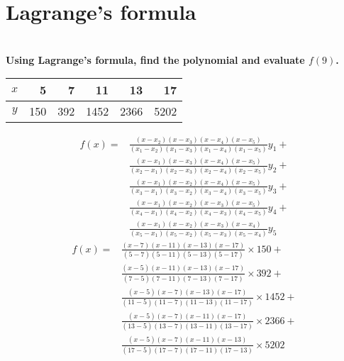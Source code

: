 \documentclass[]{book}
\begin{document}
\chapter{Lagrange's formula}

\\ \textbf{Using Lagrange's formula, find the polynomial and evaluate $f(9)$.}
\begin{center}
\begin{tabular}{|c|r|r|r|r|r|}
\hline
$x$ & 5 & 7 & 11 & 13 & 17\\
\hline
$y$ & 150 & 392 & 1452 & 2366 & 5202\\
\hline
\end{tabular}
\end{center}
\begin{equation*}
\begin{aligned}
f(x) ={} &\frac{\left(x-x_{2}\right)\left(x-x_{3}\right)\left(x-x_{4}\right)\left(x-x_{5}\right)}{\left(x_{1}-x_{2}\right)\left(x_{1}-x_{3}\right)\left(x_{1}-x_{4}\right)\left(x_{1}-x_{5}\right)}y_{1}+\\
&\frac{\left(x-x_{1}\right)\left(x-x_{3}\right)\left(x-x_{4}\right)\left(x-x_{5}\right)}{\left(x_{2}-x_{1}\right)\left(x_{2}-x_{3}\right)\left(x_{2}-x_{4}\right)\left(x_{2}-x_{5}\right)}y_{2}+\\
&\frac{\left(x-x_{1}\right)\left(x-x_{2}\right)\left(x-x_{4}\right)\left(x-x_{5}\right)}{\left(x_{3}-x_{1}\right)\left(x_{3}-x_{2}\right)\left(x_{3}-x_{4}\right)\left(x_{3}-x_{5}\right)}y_{3}+\\
&\frac{\left(x-x_{1}\right)\left(x-x_{2}\right)\left(x-x_{3}\right)\left(x-x_{5}\right)}{\left(x_{4}-x_{1}\right)\left(x_{4}-x_{2}\right)\left(x_{4}-x_{3}\right)\left(x_{4}-x_{5}\right)}y_{4}+\\
&\frac{\left(x-x_{1}\right)\left(x-x_{2}\right)\left(x-x_{3}\right)\left(x-x_{4}\right)}{\left(x_{5}-x_{1}\right)\left(x_{5}-x_{2}\right)\left(x_{5}-x_{3}\right)\left(x_{5}-x_{4}\right)}y_{5}
\end{aligned}
\end{equation*}
\begin{equation*}
\begin{aligned}
f(x) ={} &\frac{\left(x-7\right)\left(x-11\right)\left(x-13\right)\left(x-17\right)}{\left(5-7\right)\left(5-11\right)\left(5-13\right)\left(5-17\right)}\times 150+\\
&\frac{\left(x-5\right)\left(x-11\right)\left(x-13\right)\left(x-17\right)}{\left(7-5\right)\left(7-11\right)\left(7-13\right)\left(7-17\right)}\times 392+\\
&\frac{\left(x-5\right)\left(x-7\right)\left(x-13\right)\left(x-17\right)}{\left(11-5\right)\left(11-7\right)\left(11-13\right)\left(11-17\right)}\times 1452+\\
&\frac{\left(x-5\right)\left(x-7\right)\left(x-11\right)\left(x-17\right)}{\left(13-5\right)\left(13-7\right)\left(13-11\right)\left(13-17\right)}\times 2366+\\
&\frac{\left(x-5\right)\left(x-7\right)\left(x-11\right)\left(x-13\right)}{\left(17-5\right)\left(17-7\right)\left(17-11\right)\left(17-13\right)}\times 5202
\end{aligned}
\end{equation*}
\end{document}
